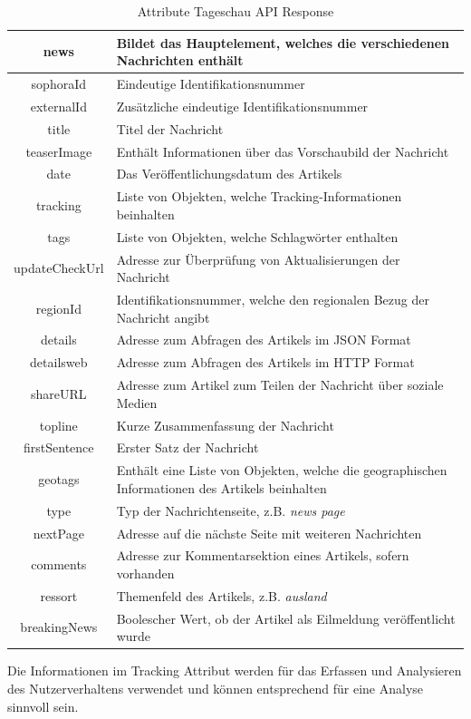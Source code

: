 \begin{table}[H]   
    \centering
    \caption{Attribute Tageschau API Response}
    \label{tab:Attribute Tageschau API Response}
    \begin{tabular}{|c|p{11cm}|} \hline 
        news & Bildet das Hauptelement, welches die verschiedenen Nachrichten enthält \\ \hline 
        sophoraId & Eindeutige Identifikationsnummer \\ \hline 
        externalId & Zusätzliche eindeutige Identifikationsnummer \\ \hline 
        title & Titel der Nachricht \\ \hline 
        teaserImage & Enthält Informationen über das Vorschaubild der Nachricht \\ \hline 
        date & Das Veröffentlichungsdatum des Artikels \\ \hline 
        tracking & Liste von Objekten, welche Tracking-Informationen beinhalten\\ \hline 
        tags & Liste von Objekten, welche Schlagwörter enthalten \\ \hline 
        updateCheckUrl & Adresse zur Überprüfung von Aktualisierungen der Nachricht \\ \hline 
        regionId & Identifikationsnummer, welche den regionalen Bezug der Nachricht angibt \\ \hline 
        details & Adresse zum Abfragen des Artikels im JSON Format \\ \hline 
        detailsweb & Adresse zum Abfragen des Artikels im HTTP Format \\ \hline 
        shareURL & Adresse zum Artikel zum Teilen der Nachricht über soziale Medien \\ \hline 
        topline & Kurze Zusammenfassung der Nachricht \\ \hline 
        firstSentence & Erster Satz der Nachricht \\ \hline 
        geotags & Enthält eine Liste von Objekten, welche die geographischen Informationen des Artikels beinhalten \\ \hline 
        type & Typ der Nachrichtenseite, z.B. \textit{news page} \\ \hline 
        nextPage & Adresse auf die nächste Seite mit weiteren Nachrichten \\ \hline 
        comments & Adresse zur Kommentarsektion eines Artikels, sofern vorhanden \\ \hline 
        ressort & Themenfeld des Artikels, z.B. \textit{ausland} \\ \hline 
        breakingNews & Boolescher Wert, ob der Artikel als Eilmeldung veröffentlicht wurde \\ \hline
    \end{tabular}
\end{table}
\newpage
Die Informationen im Tracking Attribut werden für das Erfassen und Analysieren des Nutzerverhaltens verwendet und können entsprechend für eine Analyse sinnvoll sein. 

